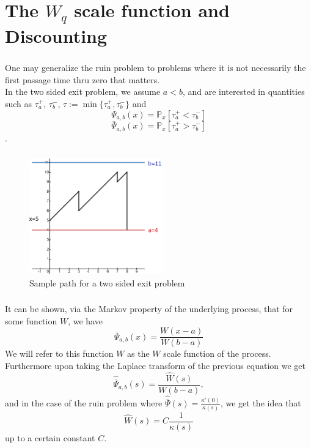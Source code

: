 \documentclass[xcolor=pdftex,dvipsnames,table]{beamer}
\theoremstyle{definition}
\def\Rui{\Psi} \def\sRui{\overline{\Psi}}
\begin{document}
\section{The $W_q$ scale function and Discounting}
\begin{frame}
\frametitle{\insertsectionhead}
One may generalize the ruin problem to problems where it is not necessarily the first passage time thru zero that matters.\\
In the two sided exit problem, we assume $a<b$, and are interested in quantities such as $\tau_a^+$, $\tau_b^-$, $\tau := \min\{ \tau_a^+, \tau_b^- \}$ and 
\[ \Rui_{a,b}(x) = \mathbb{P}_x [\tau_a^+ < \tau_b^-] \]
\[ \sRui_{a,b}(x) = \mathbb{P}_x [\tau_a^+ > \tau_b^-] \].
\end{frame}

\begin{frame}
\frametitle{\insertsectionhead}
\begin{figure}
\caption{Sample path for a two sided exit problem}
\begin{center}
\includegraphics [width=2.3in]{twosided2.png}
\end{center}
\end{figure}
\end{frame}

\begin{frame}
\frametitle{\insertsectionhead}
It can be shown, via the Markov property of the underlying process, that for some function $W$, we have 
\[ \sRui_{a,b}(x) = \frac{W(x-a)}{W(b-a)}\]
We will refer to this function $W$ as the $W$ scale function of the process.
Furthermore upon taking the Laplace transform of the previous equation we get
\[ \hat \sRui_{a,b}(s) = \frac{\hat W(s)}{W(b-a)}, \]
and in the case of the ruin problem where $\hat \sRui(s) = \frac{\kappa'(0)}{\kappa(s)}$, we get the idea that \[\hat W(s) = C \frac{1}{\kappa(s)}\] up to a certain constant $C$.
\end{frame}
\end{document}
